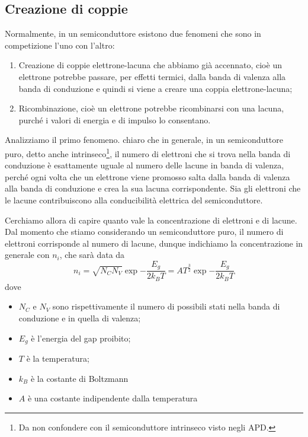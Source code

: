 \subsection{Creazione di coppie}

Normalmente, in un semiconduttore esistono due fenomeni che sono in competizione l'uno con l'altro:

\begin{enumerate}[leftmargin=0.6cm]
   \item Creazione di coppie elettrone-lacuna che abbiamo già accennato, cioè un elettrone potrebbe passare, per effetti termici, dalla banda di valenza alla banda di conduzione e quindi si viene a creare una coppia elettrone-lacuna;
   \item Ricombinazione, cioè un elettrone potrebbe ricombinarsi con una lacuna, purché i valori di energia e di impulso lo consentano.
\end{enumerate}

Analizziamo il primo fenomeno. \E chiaro che in generale, in un semiconduttore puro, detto anche intrinseco\footnote{Da non confondere con il semiconduttore intrinseco visto negli APD.}, il numero di elettroni che si trova nella banda di conduzione è esattamente uguale al numero delle lacune in banda di valenza, perché ogni volta che un elettrone viene promosso salta dalla banda di valenza alla banda di conduzione e crea la sua lacuna corrispondente. Sia gli elettroni che le lacune contribuiscono alla conducibilità elettrica del semiconduttore. 

Cerchiamo allora di capire quanto vale la concentrazione di elettroni e di lacune. Dal momento che stiamo considerando un semiconduttore puro, il numero di elettroni corrisponde al numero di lacune, dunque indichiamo la concentrazione in generale con $n_i$, che sarà data da
\begin{equation*}
   n_i
   =\sqrt{N_C N_V} \exp{ -\frac{E_g}{2k_B T} }
   =AT^{\frac{3}{2}} \exp{ -\frac{E_g}{2k_B T} }
\end{equation*}
dove
\begin{itemize}[leftmargin=0.5cm]
   \item $N_C$ e $N_V$ sono rispettivamente il numero di possibili stati nella banda di conduzione e in quella di valenza;
   \item $E_g$ è l'energia del gap proibito;
   \item $T$ è la temperatura;
   \item $k_B$ è la costante di Boltzmann
   \item $A$ è una costante indipendente dalla temperatura
\end{itemize}

